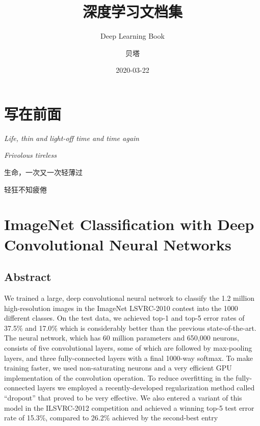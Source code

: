 \documentclass[12pt,a4paper,UTF8,twoside]{book}
\title{深度学习文档集}
\subtitle{Deep Learning Book}
\author{贝塔}
\date{2020-03-22}
\begin{document}





{
\setcounter{tocdepth}{2}
\tableofcontents
}

\hypertarget{ux5199ux5728ux524dux9762}{%
\chapter{写在前面}\label{ux5199ux5728ux524dux9762}}

\emph{Life, thin and light-off time and time again}

\emph{Frivolous tireless}

生命，一次又一次轻薄过

轻狂不知疲倦

\hypertarget{Alexnet}{%
\chapter{ImageNet Classification with Deep Convolutional Neural Networks}\label{Alexnet}}

\hypertarget{abstract}{%
\section{Abstract}\label{abstract}}

We trained a large, deep convolutional neural network to classify the 1.2 million high-resolution images in the ImageNet LSVRC-2010 contest into the 1000 different classes. On the test data, we achieved top-1 and top-5 error rates of 37.5\% and 17.0\% which is considerably better than the previous state-of-the-art. The neural network, which has 60 million parameters and 650,000 neurons, consists of five convolutional layers, some of which are followed by max-pooling layers, and three fully-connected layers with a final 1000-way softmax. To make training faster, we used non-saturating neurons and a very efficient GPU implementation of the convolution operation. To reduce overfitting in the fully-connected layers we employed a recently-developed regularization method called ``dropout'' that proved to be very effective. We also entered a variant of this model in the ILSVRC-2012 competition and achieved a winning top-5 test error rate of 15.3\%, compared to 26.2\% achieved by the second-best entry
\end{document}
